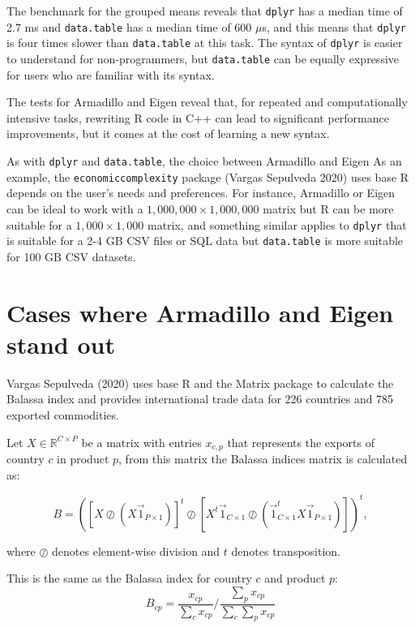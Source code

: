 \documentclass[12pt]{article}
\begin{document}
The benchmark for the grouped means reveals that \texttt{dplyr} has a
median time of 2.7 ms and \texttt{data.table} has a median time of 600
\(\mu\)s, and this means that \texttt{dplyr} is four times slower than
\texttt{data.table} at this task. The syntax of \texttt{dplyr} is easier
to understand for non-programmers, but \texttt{data.table} can be
equally expressive for users who are familiar with its syntax.

The tests for Armadillo and Eigen reveal that, for repeated and
computationally intensive tasks, rewriting R code in C++ can lead to
significant performance improvements, but it comes at the cost of
learning a new syntax.

As with \texttt{dplyr} and \texttt{data.table}, the choice between
Armadillo and Eigen As an example, the \texttt{economiccomplexity}
package (Vargas Sepulveda 2020) uses base R depends on the user's needs
and preferences. For instance, Armadillo or Eigen can be ideal to work
with a \(1,000,000 \times 1,000,000\) matrix but R can be more suitable
for a \(1,000 \times 1,000\) matrix, and something similar applies to
\texttt{dplyr} that is suitable for a 2-4 GB CSV files or SQL data but
\texttt{data.table} is more suitable for 100 GB CSV datasets.

\section{Cases where Armadillo and Eigen stand
out}\label{cases-where-armadillo-and-eigen-stand-out}

Vargas Sepulveda (2020) uses base R and the Matrix package to calculate
the Balassa index and provides international trade data for 226
countries and 785 exported commodities.

Let \(X \in \mathbb{R}^{C\times P}\) be a matrix with entries
\(x_{c,p}\) that represents the exports of country \(c\) in product
\(p\), from this matrix the Balassa indices matrix is calculated as:

\begin{equation}
\label{eq:balassa1}
B = ([X \oslash (X \vec{1}_{P\times 1})]^t \oslash  [X^t \vec{1}_{C\times 1} \oslash (\vec{1}_{C\times 1}^t X \vec{1}_{P\times 1})])^t,
\end{equation}

where \(\oslash\) denotes element-wise division and \(t\) denotes
transposition.

This is the same as the Balassa index for country \(c\) and product
\(p\): \begin{equation}
\label{eq:balassa2}
B_{cp} = \frac{x_{cp}}{\sum_c x_{cp}} / \frac{\sum_p x_{cp}}{\sum_{c}\sum_{p} x_{cp}}
\end{equation}
\end{document}

